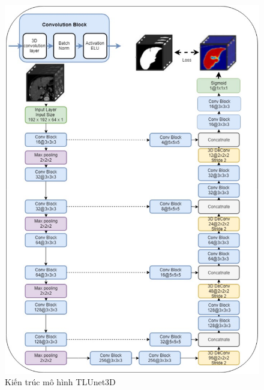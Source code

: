 \begin{figure}[H]
    \centering
    \includegraphics[width=14cm]{images/liver/TLUnet3D/TLUnet3D.png}
    \caption{Kiến trúc mô hình TLUnet3D\cite{LV_LIVER}}
    \label{tlunet}
\end{figure}

